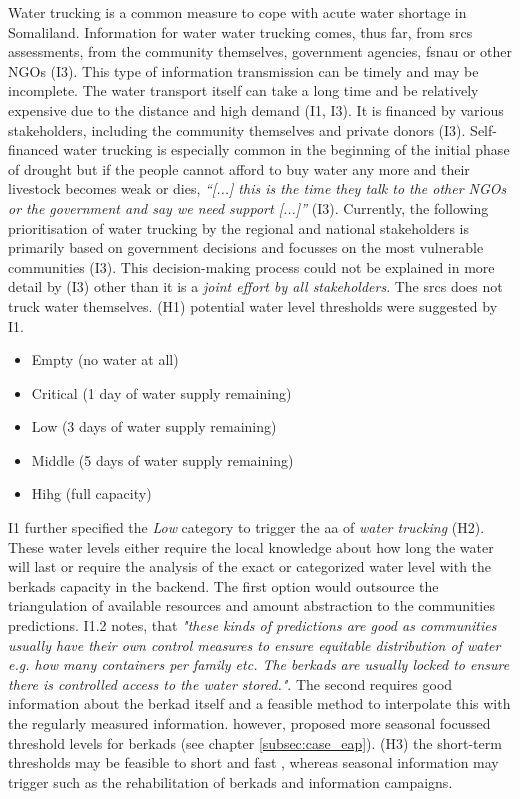 Water trucking is a common measure to cope with acute water shortage in Somaliland. Information for water water trucking comes, thus far, from \acrshort{srcs} assessments, from the community themselves, government agencies, \acrshort{fsnau} or other NGOs (I3). This type of information transmission can be timely and may be incomplete. The water transport itself can take a long time and be relatively expensive due to the distance and high demand (I1, I3). It is financed by various stakeholders, including the community themselves and private donors (I3). Self-financed water trucking is especially common in the beginning of the initial phase of drought but if the people cannot afford to buy water any more and their livestock becomes weak or dies, \textit{“[...] this is the time they talk to the other NGOs or the government and say we need support [...]”} (I3). Currently, the following prioritisation of water trucking by the regional and national stakeholders is primarily based on government decisions and focusses on the most vulnerable communities (I3). This decision-making process could not be explained in more detail by (I3) other than it is a \textit{joint effort by all stakeholders}. The \acrshort{srcs} does not truck water themselves.\newline
(H1) potential water level thresholds were suggested by I1.
\begin{itemize}
    \item Empty (no water at all)
    \item Critical (1 day of water supply remaining)
    \item Low (3 days of water supply remaining)
    \item Middle (5 days of water supply remaining)
    \item Hihg (full capacity)
\end{itemize}
I1 further specified the \textit{Low} category to trigger the \acrshort{aa} of \textit{water trucking} (H2). These water levels either require the local knowledge about how long the water will last or require the analysis of the exact or categorized water level with the berkads capacity in the backend. The first option would outsource the triangulation of available resources and amount abstraction to the communities predictions. I1.2 notes, that \textit{"these kinds of predictions are good as communities usually have their own control measures to ensure equitable distribution of water e.g. how many containers per family etc. The berkads are usually locked to ensure there is controlled access to the water stored."}. The second requires good information about the berkad itself and a feasible method to interpolate this with the regularly measured information. \autocite{gualazziniEWEAEarlyWarning2021} however, proposed more seasonal focussed threshold levels for berkads (see chapter \ref*{subsec:case_eap}). (H3) the short-term thresholds may be feasible to short and fast , whereas seasonal information may trigger  such as the rehabilitation of berkads and information campaigns.

